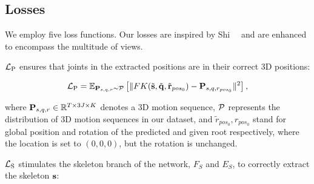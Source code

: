 \iftog
\subsection{Losses}
\fi


We employ five loss functions. Our losses are inspired by Shi~\etal~\cite{shi2020motionet} and are enhanced to encompass the multitude of views.

$\mathcal{L}_{\text{P}}$ ensures that joints in the extracted positions are in their correct 3D positions:

\setlength{\abovedisplayskip}{-7pt plus 2pt minus 2pt}
\setlength{\belowdisplayskip}{5pt plus 2pt minus 2pt}

\begin{align}
\mathcal{L}_{\text{P}} = \mathbb{E}_{{\bf P}_{s,q,r}\sim \mathcal{P}}\left[ \Vert FK(\tilde{{\bf s}}, \tilde{{\bf q}},\tilde{{\bf r}}_{pos_0})-{\bf P}_{s,q,r_{pos_0}}\Vert^2 \right],
\end{align}

where ${\bf P}_{s,q,r}\in \mathbb{R}^{T\times 3J\times K}$ denotes a 3D motion sequence, $\mathcal{P}$ represents the distribution of 3D motion sequences in our dataset,
and $\tilde{r}_{pos_0}, r_{pos_0}$ stand for global position and rotation of the predicted and given root respectively, where the location is set to $(0,0,0)$, but the rotation is unchanged.

$\mathcal{L}_{\text{S}}$ stimulates the skeleton branch of the network, $F_S$ and $E_S$, to correctly extract the skeleton ${\bf s}$:
\ifeccv
    \setlength{\abovedisplayskip}{-7pt plus 2pt minus 2pt}
    \setlength{\belowdisplayskip}{5pt plus 2pt minus 2pt}
\fi


